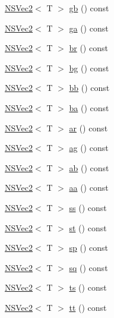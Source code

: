 \begin{DoxyCompactItemize}
\item 
\hyperlink{structNSVec2}{N\-S\-Vec2}$<$ T $>$ \hyperlink{structNSVec4_aa526b6d46036b82f40ede054b1de061e}{gb} () const 
\item 
\hyperlink{structNSVec2}{N\-S\-Vec2}$<$ T $>$ \hyperlink{structNSVec4_af5dfcb2a40e1ca93e724e1bae4ca7c68}{ga} () const 
\item 
\hyperlink{structNSVec2}{N\-S\-Vec2}$<$ T $>$ \hyperlink{structNSVec4_a567db37e8d27202fd95c0570e85c7b8a}{br} () const 
\item 
\hyperlink{structNSVec2}{N\-S\-Vec2}$<$ T $>$ \hyperlink{structNSVec4_a3413f1d8a097c20816b3ac8ce5361d8d}{bg} () const 
\item 
\hyperlink{structNSVec2}{N\-S\-Vec2}$<$ T $>$ \hyperlink{structNSVec4_a21d1f6e50ee2b59586a39609eba15431}{bb} () const 
\item 
\hyperlink{structNSVec2}{N\-S\-Vec2}$<$ T $>$ \hyperlink{structNSVec4_a03d7b59bc5ea6d570895dc658914a481}{ba} () const 
\item 
\hyperlink{structNSVec2}{N\-S\-Vec2}$<$ T $>$ \hyperlink{structNSVec4_a6439381fb05b53dbda9bebc614694096}{ar} () const 
\item 
\hyperlink{structNSVec2}{N\-S\-Vec2}$<$ T $>$ \hyperlink{structNSVec4_a5f103ae562991aa39cba2d08c02b1fab}{ag} () const 
\item 
\hyperlink{structNSVec2}{N\-S\-Vec2}$<$ T $>$ \hyperlink{structNSVec4_aef5c4026cf18a50986b4901c6e4a13bf}{ab} () const 
\item 
\hyperlink{structNSVec2}{N\-S\-Vec2}$<$ T $>$ \hyperlink{structNSVec4_ad4b93d624d5b8c489b0f463dec03d3ec}{aa} () const 
\item 
\hyperlink{structNSVec2}{N\-S\-Vec2}$<$ T $>$ \hyperlink{structNSVec4_a49722a81340aa51e97c27eb5d5fb923c}{ss} () const 
\item 
\hyperlink{structNSVec2}{N\-S\-Vec2}$<$ T $>$ \hyperlink{structNSVec4_ae19636da52a0edc48dbafd5c1c77b5ef}{st} () const 
\item 
\hyperlink{structNSVec2}{N\-S\-Vec2}$<$ T $>$ \hyperlink{structNSVec4_ae0c7f6ae1941046cd15864afbf449cd9}{sp} () const 
\item 
\hyperlink{structNSVec2}{N\-S\-Vec2}$<$ T $>$ \hyperlink{structNSVec4_a8c75bd05e1a42cce9808c0ef8bb58a7a}{sq} () const 
\item 
\hyperlink{structNSVec2}{N\-S\-Vec2}$<$ T $>$ \hyperlink{structNSVec4_aaf3629fe09575b780e0d5c51d6f3d8ae}{ts} () const 
\item 
\hyperlink{structNSVec2}{N\-S\-Vec2}$<$ T $>$ \hyperlink{structNSVec4_aa7141f951ec584f302b1df0379857209}{tt} () const 

\end{DoxyCompactItemize}
